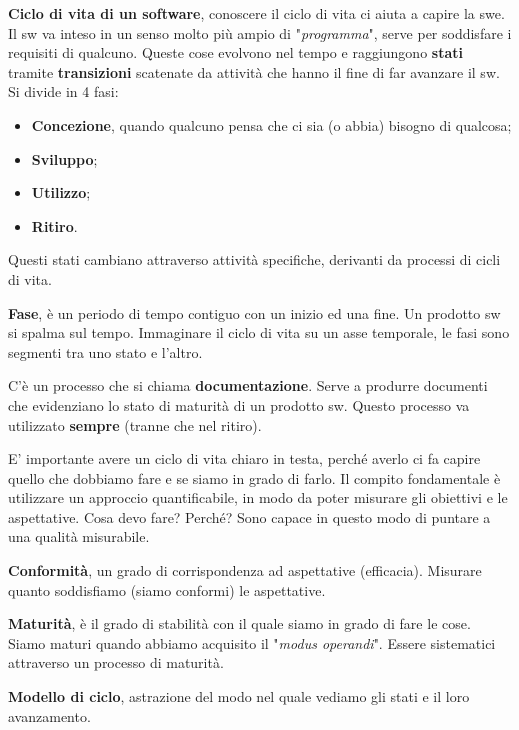 
\textbf{Ciclo di vita di un software}, conoscere il ciclo di vita ci aiuta a capire la swe. Il sw va inteso in un senso molto più ampio di "\textit{programma}", serve per soddisfare i requisiti di qualcuno. Queste cose evolvono nel tempo e raggiungono \textbf{stati} tramite \textbf{transizioni} scatenate da attività che hanno il fine di far avanzare il sw. Si divide in 4 fasi:

\begin{itemize}

	\item \textbf{Concezione}, quando qualcuno pensa che ci sia (o abbia) bisogno di qualcosa;
	\item \textbf{Sviluppo};
	\item \textbf{Utilizzo};
	\item \textbf{Ritiro}.

\end{itemize}

Questi stati cambiano attraverso attività specifiche, derivanti da processi di cicli di vita.

\textbf{Fase}, è un periodo di tempo contiguo con un inizio ed una fine. Un prodotto sw si spalma sul tempo. Immaginare il ciclo di vita su un asse temporale, le fasi sono segmenti tra uno stato e l'altro.

C'è un processo che si chiama \textbf{documentazione}. Serve a produrre documenti che evidenziano lo stato di maturità di un prodotto sw. Questo processo va utilizzato \textbf{sempre} (tranne che nel ritiro).

E' importante avere un ciclo di vita chiaro in testa, perché averlo ci fa capire quello che dobbiamo fare e se siamo in grado di farlo. Il compito fondamentale è utilizzare un approccio quantificabile, in modo da poter misurare gli obiettivi e le aspettative. Cosa devo fare? Perché? Sono capace in questo modo di puntare a una qualità misurabile.

\textbf{Conformità}, un grado di corrispondenza ad aspettative (efficacia). Misurare quanto soddisfiamo (siamo conformi) le aspettative.

\textbf{Maturità}, è il grado di stabilità con il quale siamo in grado di fare le cose. Siamo maturi quando abbiamo acquisito il "\textit{modus operandi}". Essere sistematici attraverso un processo di maturità.

\textbf{Modello di ciclo}, astrazione del modo nel quale vediamo gli stati e il loro avanzamento.

